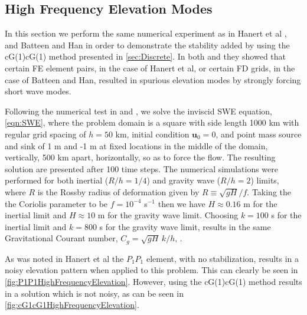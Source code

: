 \subsection{High Frequency Elevation Modes} \label{sse:ElevModes}
  In this section we perform the same numerical experiment as in Hanert et al
  \cite{Hanert2002}, and Batteen and Han \cite{Batteen1981} in order to
  demonstrate the stability added by using the cG(1)cG(1) method presented in
  \autoref{sec:Discrete}. In both \cite{Hanert2002} and \cite{Batteen1981} they
  showed that certain FE element pairs, in the case of Hanert et al, or certain FD
  grids, in the case of Batteen and Han, resulted in spurious elevation modes by
  strongly forcing short wave modes.

  Following the numerical test in \cite{Hanert2002} and \cite{Batteen1981}, we
  solve the inviscid SWE equation, \eqref{eqn:SWE}, where the problem domain is
  a square with side length 1000 km with regular grid spacing of $h=50$ km,
  initial condition $\mathbf{u}_0 = 0$, and point mass source and sink of 1 m
  and -1 m at fixed locations in the middle of the domain, vertically, 500 km
  apart, horizontally, so as to force the flow.  The resulting solution are
  presented after 100 time steps. The numerical simulations were performed for
  both inertial ($R/h = 1/4$) and gravity wave ($R/h = 2$) limits, where $R$ is
  the Rossby radius of deformation given by $R \equiv \sqrt{gH}/f$. Taking the
  the Coriolis parameter to be $f = 10^{-4}$ s$^{-1}$ then we have $H \approx
  0.16$ m for the inertial limit and $H \approx 10$ m for the gravity wave
  limit. Choosing $k = 100$ s for the inertial limit and $k = 800$ s for the
  gravity wave limit, results in the same Gravitational Courant number, $C_g =
  \sqrt{gH}\,k/h$, \cite{Le-Roux1998}.

  As was noted in Hanert et al \cite{Hanert2002} the $P_1P_1$ element, with no
  stabilization, results in a noisy elevation pattern when applied to this
  problem. This can clearly be seen in \autoref{fig:P1P1HighFrequencyElevation}.
  However, using the cG(1)cG(1) method results in a solution which is not noisy,
  as can be seen in \autoref{fig:cG1cG1HighFrequencyElevation}.
